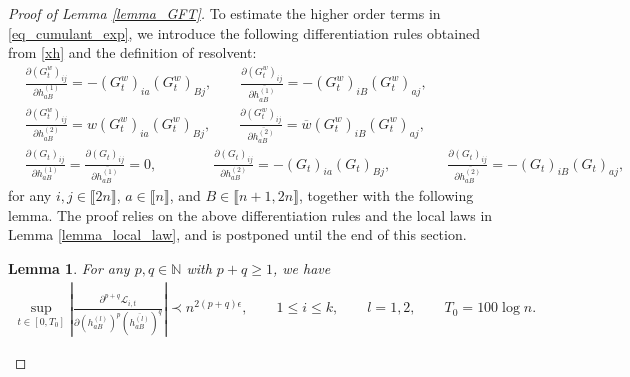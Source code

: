 \documentclass[10pt,reqno]{amsart}
\numberwithin{equation}{section}
\numberwithin{figure}{section}
\theoremstyle{plain}
\newtheorem{lemma}[theorem]{Lemma}
\newcommand{\N}{{\mathbb{N}}}
\newcommand{\<}{\langle}
\renewcommand{\>}{\rangle}
\newcommand{\II}{\mathcal{L}_{i,t}}
\begin{document}
\begin{proof}[Proof of Lemma \ref{lemma_GFT}]
	To estimate the higher order terms in \eqref{eq_cumulant_exp}, we introduce the following differentiation rules  obtained from \eqref{xh} and the definition of resolvent:
\begin{align}
	&\frac{\partial (G^w_t)_{ij}}{\partial h^{(1)}_{aB}}=-(G^w_t)_{ia} (G^w_t)_{Bj}, \qquad \frac{\partial (G^w_t)_{ij}}{\partial \overline{h^{(1)}_{aB}}}=-(G^w_t)_{iB} (G^w_t)_{aj},\label{eq_diff_1}\\
	&\frac{\partial (G^w_t)_{ij}}{\partial h^{(2)}_{aB}}=w(G^w_t)_{ia} (G^w_t)_{Bj}, \qquad \frac{\partial (G^w_t)_{ij}}{\partial \overline{h^{(2)}_{aB}}}=\overline{w} (G^w_t)_{iB} (G^w_t)_{aj},\label{eq_diff_2}\\
	&\frac{\partial (G_t)_{ij}}{\partial h^{(1)}_{aB}}=\frac{\partial (G_t)_{ij}}{\partial \overline{h^{(1)}_{aB}}}=0, \qquad\qquad \frac{\partial (G_t)_{ij}}{\partial h^{(2)}_{aB}}=-(G_t)_{ia} (G_t)_{Bj}, \qquad\qquad \frac{\partial (G_t)_{ij}}{\partial \overline{h^{(2)}_{aB}}}= -(G_t)_{iB} (G_t)_{aj},\label{eq_diff_3}
\end{align}
for any $i,j \in \llbracket 2n \rrbracket $, $a \in 
\llbracket n \rrbracket$, and 
$B\in \llbracket n+1,2n \rrbracket$, together with the following lemma. The proof relies on the above differentiation rules and the local laws in Lemma \ref{lemma_local_law}, and is postponed until the end of this section.
\begin{lemma}\label{lemma_diff}
	For any $p,q \in \N$ with $p+q\geq 1$, we have
	\begin{align}\label{eq_bound_k}
		\sup_{t \in[0,T_0]} \left|  \frac{\partial^{p+q} \II }{\partial (h^{(l)}_{aB})^{p} (\overline{h^{(l)}_{aB}})^{q}} \right| \prec n^{2(p+q)\epsilon}, \qquad 1\leq i\leq k, \qquad l=1,2, \qquad T_0=100 \log n.
	\end{align}
\end{lemma}


\end{proof}
\end{document}

